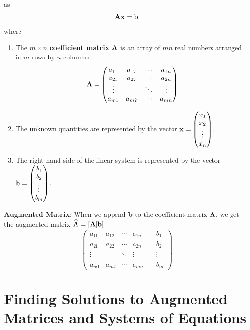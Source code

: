 \documentclass[]{book}
\theoremstyle{definition}
\theoremstyle{definition}
\theoremstyle{definition}
\theoremstyle{remark}
\begin{document}
as \[{\bf A x = b}\] where

\begin{enumerate}

\item The $m \times n$ \textbf{coefficient matrix} ${\bf A}$ is an array of $m n$  real numbers arranged in $m$ rows by $n$ columns:
            $${\bf A}=\begin{pmatrix}
            a_{11} & a_{12} & \cdots & a_{1n} \\
            a_{21} & a_{22} & \cdots & a_{2n} \\
            \vdots &  & \ddots & \vdots \\
            a_{m1} & a_{m2} & \cdots & a_{mn}
            \end{pmatrix}$$

        \item The unknown quantities are represented by the vector ${\bf x}=\begin{pmatrix} x_1\\x_2\\\vdots\\x_n \end{pmatrix}$.
        \item The right hand side of the linear system is represented by the vector ${\bf b}=\begin{pmatrix} b_1\\b_2\\\vdots\\b_m \end{pmatrix}$.
    \end{enumerate}

\textbf{Augmented Matrix}: When we append \(\bf b\) to the coefficient
matrix \(\bf A\), we get the augmented matrix
\(\widehat{\bf A}=[\bf A | b]\) \[\begin{pmatrix}
            a_{11} & a_{12} & \cdots & a_{1n} & | & b_1\\
            a_{21} & a_{22} & \cdots & a_{2n} & | & b_2\\
            \vdots &  & \ddots & \vdots & | & \vdots\\
            a_{m1} & a_{m2} & \cdots & a_{mn} & | & b_m
            \end{pmatrix}\]

\section{Finding Solutions to Augmented Matrices and Systems of
Equations}\label{finding-solutions-to-augmented-matrices-and-systems-of-equations}
\end{document}
